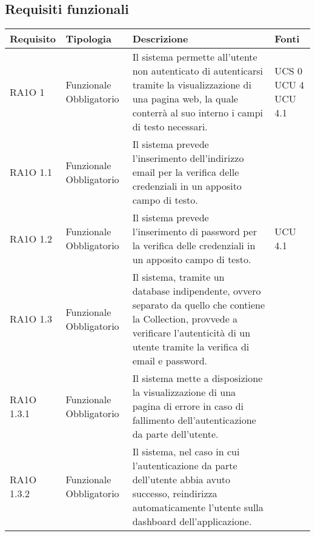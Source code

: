 \subsection{Requisiti funzionali }

      \begin{center}
      \bgroup
      \def\arraystretch{1.8}
      \begin{longtable}{ | l | p{2cm} | p{5cm} | p{1.7cm} |}
    
      \cellcolor[gray]{0.9} \textbf{Requisito} & \cellcolor[gray]{0.9} \textbf{Tipologia} 
      & \cellcolor[gray]{0.9} \textbf{Descrizione} & \cellcolor[gray]{0.9} \textbf{Fonti} \\ \hline
      
        RA1O 1 & Funzionale \newline  Obbligatorio  & Il sistema permette all'utente non autenticato di autenticarsi tramite la visualizzazione di una pagina web, la quale conterrà al suo interno i campi di testo necessari.  &  UCS 0 \newline  UCU 4 \newline  UCU 4.1 \newline  \\ \hline      
        RA1O 1.1 & Funzionale \newline  Obbligatorio  & Il sistema prevede l'inserimento dell'indirizzo email per la verifica delle credenziali in un apposito campo di testo. &  \\ \hline      
        RA1O 1.2 & Funzionale \newline  Obbligatorio  & Il sistema prevede l'inserimento di password per la verifica delle credenziali in un apposito campo di testo. &  UCU 4.1 \newline  \\ \hline      
        RA1O 1.3 & Funzionale \newline  Obbligatorio  & Il sistema, tramite un database indipendente, ovvero separato da quello che contiene la Collection, provvede a verificare l'autenticità  di un utente tramite la verifica di email e password. &  \\ \hline      
        RA1O 1.3.1 & Funzionale \newline  Obbligatorio  & Il sistema mette a disposizione la visualizzazione di una pagina di errore in caso di fallimento dell'autenticazione da parte dell'utente. &  \\ \hline      
        RA1O 1.3.2 & Funzionale \newline  Obbligatorio  & Il sistema, nel caso in cui l'autenticazione da parte dell'utente abbia avuto successo, reindirizza automaticamente l'utente sulla dashboard dell'applicazione. &  \\ \hline      

\end{longtable}
\end{center}

